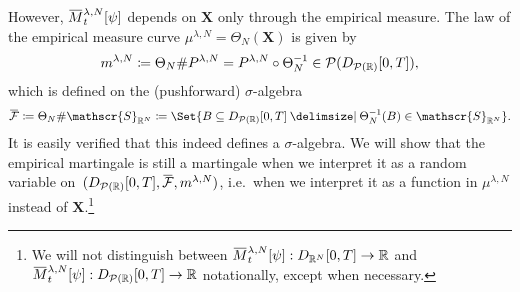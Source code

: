 However, \(\ol{M}_t^{\lambda,N}[\psi]\) depends on \( \bm{X} \) only through the empirical measure.
The law of the empirical measure curve \(\mu^{\lambda, N} = \Theta_N(\bm{X})\) is given by
\begin{equation}
  m^{\lambda,N} \coloneqq \Theta_N \# P^{\lambda, N} = P^{\lambda, N} \circ \Theta_N^{-1} \in \mathcal{P}(D_{\mathcal{P}(\mathbb{R})}[0,T]),
\end{equation}
which is defined on the (pushforward) \( \sigma \)-algebra
\begin{equation}
  \ol{\cF} \coloneqq \Theta_N \# \mathscr{S}_{\potspace^N} \coloneqq \Set{B \subseteq D_{\cP(\potspace)}[0,T] \given \Theta_N^{-1}(B) \in \mathscr{S}_{\potspace^N}}.
\end{equation}
It is easily verified that this indeed defines a \( \sigma \)-algebra.
We will show that the empirical martingale is still a martingale when we interpret it as a random variable on~\((D_{\cP(\potspace)}[0,T], \ol{\cF}, \lawmu^{\lambda,N})\), i.e.\ when we interpret it as a function in \(\mu^{\lambda,N}\) instead of \(\bm{X}\).\footnote{We will not distinguish between \( \ol{M}_t^{\lambda,N}[\psi] :  D_{\potspace^N}[0,T] \to \bR \) and \( \ol{M}_t^{\lambda,N}[\psi] :  D_{\cP(\potspace)}[0,T] \to \bR \) notationally, except when necessary.}

